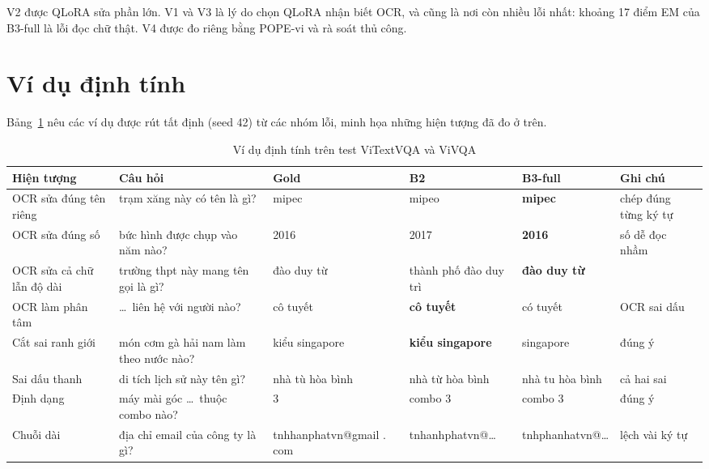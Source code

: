 V2 được QLoRA sửa phần lớn. V1 và V3 là lý do chọn QLoRA nhận biết OCR, và cũng là
nơi còn nhiều lỗi nhất: khoảng 17 điểm EM của B3-full là lỗi đọc chữ thật. V4 được
đo riêng bằng POPE-vi và rà soát thủ công.

\section{Ví dụ định tính}
\label{sec:dis-examples}

Bảng~\ref{tab:dis-examples} nêu các ví dụ được rút tất định (seed 42) từ các nhóm
lỗi, minh họa những hiện tượng đã đo ở trên.

\begin{table}[htbp]
\caption{Ví dụ định tính trên test ViTextVQA và ViVQA}
\label{tab:dis-examples}
\centering
\footnotesize
\begin{tabular}{p{}p{}p{}p{}p{}p{}}
\toprule
\raggedright \textbf{Hiện tượng} & \raggedright \textbf{Câu hỏi} & \raggedright \textbf{Gold} & \raggedright \textbf{B2} & \raggedright \textbf{B3-full} & \raggedright \textbf{Ghi chú} \tabularnewline
\midrule
\raggedright OCR sửa đúng tên riêng & \raggedright trạm xăng này có tên là gì? & \raggedright mipec & \raggedright mipeo & \raggedright \textbf{mipec} & \raggedright chép đúng từng ký tự \tabularnewline
\raggedright OCR sửa đúng số & \raggedright bức hình được chụp vào năm nào? & \raggedright 2016 & \raggedright 2017 & \raggedright \textbf{2016} & \raggedright số dễ đọc nhầm \tabularnewline
\raggedright OCR sửa cả chữ lẫn độ dài & \raggedright trường thpt này mang tên gọi là gì? & \raggedright đào duy từ & \raggedright thành phố đào duy trì & \raggedright \textbf{đào duy từ} & \tabularnewline
\raggedright OCR làm phân tâm & \raggedright \ldots\ liên hệ với người nào? & \raggedright cô tuyết & \raggedright \textbf{cô tuyết} & \raggedright có tuyết & \raggedright OCR sai dấu \tabularnewline
\raggedright Cắt sai ranh giới & \raggedright món cơm gà hải nam làm theo nước nào? & \raggedright kiểu singapore & \raggedright \textbf{kiểu singapore} & \raggedright singapore & \raggedright đúng ý \tabularnewline
\raggedright Sai dấu thanh & \raggedright di tích lịch sử này tên gì? & \raggedright nhà tù hòa bình & \raggedright nhà từ hòa bình & \raggedright nhà tu hòa bình & \raggedright cả hai sai \tabularnewline
\raggedright Định dạng & \raggedright máy mài góc \ldots\ thuộc combo nào? & \raggedright 3 & \raggedright combo 3 & \raggedright combo 3 & \raggedright đúng ý \tabularnewline
\raggedright Chuỗi dài & \raggedright địa chỉ email của công ty là gì? & \raggedright tnhhanphat\-vn@gmail . com & \raggedright tnhanhphat\-vn@\ldots & \raggedright tnhphanhat\-vn@\ldots & \raggedright lệch vài ký tự \tabularnewline
\bottomrule
\end{tabular}
\end{table}

